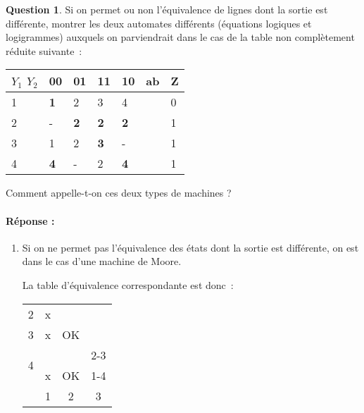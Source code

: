 \documentclass[11pt,a4paper,dvipsnames,]{article}
\theoremstyle{definition}%
\newtheorem{Q}{Question}[] %
\newcommand{\reponse}[1]{%
	\ifthenelse {\boolean{corrige}} {\paragraph{Réponse :} \color{darkblue}   #1\color{black}} {}
 }
\begin{document}
\begin{Q}
	Si on permet ou non l'équivalence de lignes dont la sortie est différente, montrer les deux automates différents (équations logiques et logigrammes) auxquels on parviendrait dans le cas de la table non complètement réduite suivante~:

	\begin{center}

	\begin{tabular}{|l|l|l|l|l|l|l|}
	\hline
	$Y_1$ $Y_2$ & 00         & 01         & 11         & 10         & ab & Z \\ \hline
	1           & \textbf{1} & 2          & 3          & 4          &    & 0 \\ \cline{1-5} \cline{7-7}
	2           & -          & \textbf{2} & \textbf{2} & \textbf{2} &    & 1 \\ \cline{1-5} \cline{7-7}
	3           & 1          & 2          & \textbf{3} & -          &    & 1 \\ \cline{1-5} \cline{7-7}
	4           & \textbf{4} & -          & 2          & \textbf{4} &    & 1 \\ \cline{1-5} \cline{7-7}
	\end{tabular}

	\end{center}

	Comment appelle-t-on ces deux types de machines ?

\reponse{
	\begin{enumerate}
		\item Si on ne permet pas l'équivalence des états dont la sortie est différente, on est dans le cas d'une machine de Moore.

		La table d'équivalence correspondante est donc~:
		\begin{center}
			\begin{tabular}{cccc} \cline{1-2}
				\multicolumn{1}{|c|}{2}	& 						\multicolumn{1}{c|}{\cellcolor{red!25}x} 					& 																	& \\ \cline{1-3}
				\multicolumn{1}{|c|}{3}	& 						\multicolumn{1}{c|}{\cellcolor{red!25}x} 					& \multicolumn{1}{c|}{\cellcolor{green!25}OK}						& \\ \cline{1-4}
				\multicolumn{1}{|c|}{\multirow{2}{*}{4}} & 		\multicolumn{1}{c|}{\cellcolor{red!25}}						& \multicolumn{1}{c|}{\cellcolor{green!25}} 						& \multicolumn{1}{c|}{\cellcolor{red!25}2-3}\\
				\multicolumn{1}{|c|}{} & 						\multicolumn{1}{c|}{\multirow{-2}{*}{\cellcolor{red!25}x}} & \multicolumn{1}{c|}{\multirow{-2}{*}{\cellcolor{green!25}OK}} 	& \multicolumn{1}{c|}{\cellcolor{red!25}1-4} \\ \cline{1-4}
			 & 													\multicolumn{1}{|c|}{1} & 									  \multicolumn{1}{c|}{2} 											& \multicolumn{1}{c|}{3} \\ \cline{2-4}
			\end{tabular}
		\end{center}


\end{enumerate}}
\end{Q}
\end{document}
